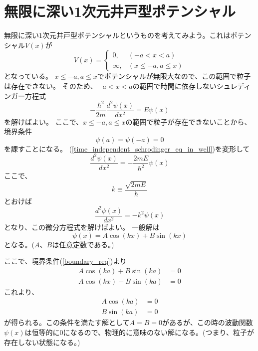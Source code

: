 
\section{無限に深い1次元井戸型ポテンシャル}
無限に深い$1$次元井戸型ポテンシャルというものを考えてみよう。これはポテンシャル$V(x)$が
\begin{equation}
  V(x) =
  \begin{cases}
    0,       & (-a < x < a) \\
    \infty , & (x \leq -a , a \leq x)
  \end{cases}
\end{equation}
となっている。
$x \leq -a , a \leq x$でポテンシャルが無限大なので、この範囲で粒子は存在できない。
そのため、$-a < x < a$の範囲で時間に依存しないシュレディンガー方程式
\begin{equation}
  \label{time_independent_schrodinger_eq_in_well}
  - \dfrac{\hbar^2}{2m} \dfrac{d^2 \psi(x)}{d x^2} = E\psi(x)
\end{equation}
を解けばよい。
ここで、$x \leq -a , a \leq x$の範囲で粒子が存在できないことから、
境界条件
\begin{equation}
  \label{boundary_req}
  \psi(a) = \psi(-a) = 0
\end{equation}
を課すことになる。
(\ref{time_independent_schrodinger_eq_in_well})を変形して
\begin{equation}
  \dfrac{d^2 \psi(x)}{d x^2} = -\dfrac{2mE}{\hbar^2}\psi(x)
\end{equation}
ここで、
\begin{equation}
  \label{k_equiv}
  k \equiv \dfrac{\sqrt{2mE}}{\hbar}
\end{equation}
とおけば
\begin{equation}
  \dfrac{d^2 \psi(x)}{d x^2} = -k^2\psi(x)
\end{equation}
となり、この微分方程式を解けばよい。
一般解は
\begin{equation}
  \psi(x) = A\cos(kx) + B\sin(kx)
\end{equation}
となる。($A$、$B$は任意定数である。)

ここで、境界条件(\ref{boundary_req})より
\begin{align}
  A\cos(ka) + B\sin(ka) &= 0 \\
  A\cos(kx) - B\sin(ka) &= 0
\end{align}
これより、
\begin{align}
  A\cos(ka) &= 0 \\
  B\sin(ka) &= 0
\end{align}
が得られる。この条件を満たす解として$A=B=0$があるが、この時の波動関数$\psi(x)$は恒等的に$0$になるので、物理的に意味のない解になる。(つまり、粒子が存在しない状態になる。)

